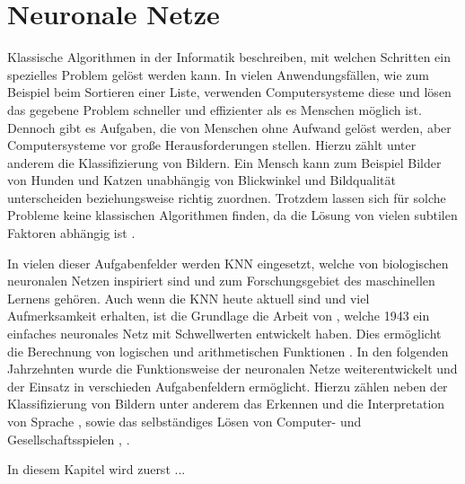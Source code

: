 \section{Neuronale Netze}
\label{sec:neuroal_networks}
Klassische Algorithmen in der Informatik beschreiben, mit welchen Schritten ein spezielles Problem gelöst werden kann. In vielen Anwendungsfällen, wie zum Beispiel beim Sortieren einer Liste, verwenden Computersysteme diese und lösen das gegebene Problem schneller und effizienter als es Menschen möglich ist. 
Dennoch gibt es Aufgaben, die von Menschen ohne Aufwand gelöst werden, aber Computersysteme vor große Herausforderungen stellen. Hierzu zählt unter anderem die Klassifizierung von Bildern. Ein Mensch kann zum Beispiel Bilder von Hunden und Katzen unabhängig von Blickwinkel und Bildqualität unterscheiden beziehungsweise richtig zuordnen. Trotzdem lassen sich für solche Probleme keine klassischen Algorithmen finden, da die Lösung von vielen subtilen Faktoren abhängig ist \cite{kriesel2008kleiner}.

In vielen dieser Aufgabenfelder werden \ac{KNN} eingesetzt, welche von biologischen neuronalen Netzen inspiriert sind und zum Forschungsgebiet des maschinellen Lernens gehören. Auch wenn die \ac{KNN} heute aktuell sind und viel Aufmerksamkeit erhalten, ist die Grundlage die Arbeit von \citeauthor{mcculloch1943logical}, welche 1943 ein einfaches neuronales Netz mit Schwellwerten entwickelt haben. Dies ermöglicht die Berechnung von logischen und arithmetischen Funktionen \cite{mcculloch1943logical}. In den folgenden Jahrzehnten wurde die Funktionsweise der neuronalen Netze weiterentwickelt und der Einsatz in verschieden Aufgabenfeldern ermöglicht. Hierzu zählen neben der Klassifizierung von Bildern \cite{krizhevsky2012imagenet} unter anderem das Erkennen und die Interpretation von Sprache \cite{hinton2012deep}, \cite{andor2016globally} sowie das selbständiges Lösen von Computer- und Gesellschaftsspielen \cite{mnih2013playing}, \cite{silver2016mastering}. 

In diesem Kapitel wird zuerst ...
